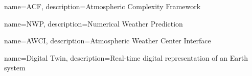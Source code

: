 {
name=ACF,
description={Atmospheric Complexity Framework}
}

{
name=NWP,
description={Numerical Weather Prediction}
}

{
name=AWCI,
description={Atmospheric Weather Center Interface}
}

{
name=Digital Twin,
description={Real-time digital representation of an Earth system}
}
